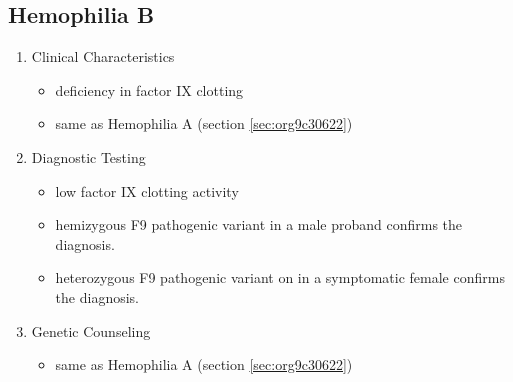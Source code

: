 \documentclass{scrartcl}
\begin{document}
\subsection{Hemophilia B}
\label{sec:org01a4cdb}
\begin{enumerate}
\item Clinical Characteristics
\label{sec:org5e40556}
\begin{itemize}
\item deficiency in factor IX clotting
\item same as Hemophilia A (section \ref{sec:org9c30622})
\end{itemize}
\item Diagnostic Testing
\label{sec:org8e107b8}
\begin{itemize}
\item low factor IX clotting activity
\item hemizygous F9 pathogenic variant in a male proband confirms the
diagnosis.
\item heterozygous F9 pathogenic variant on in a symptomatic female
confirms the diagnosis.
\end{itemize}
\item Genetic Counseling
\label{sec:org70367f7}
\begin{itemize}
\item same as Hemophilia A (section \ref{sec:org9c30622})
\end{itemize}
\end{enumerate}
\end{document}
